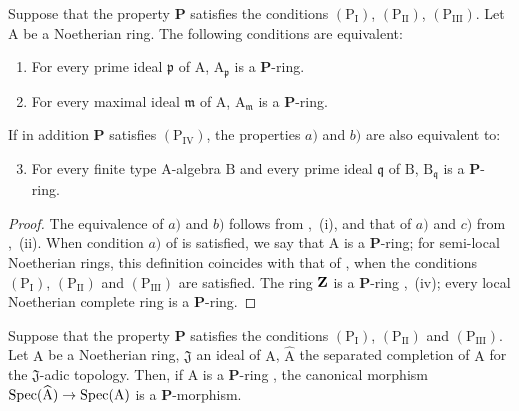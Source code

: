 \begin{corollary}[7.4.5]
\label{IV.7.4.5}
Suppose that the property $\boldsymbol{P}$ satisfies the conditions $(\mathrm{P_I})$, $(\mathrm{P_{II}})$, $(\mathrm{P_{III}})$.
Let $\mathrm{A}$ be a Noetherian ring.
The following conditions are equivalent:
\begin{enumerate}[label=\emph{\alph*)}]
  \item For every prime ideal $\mathfrak{p}$ of $\mathrm{A}$, $\mathrm{A}_\mathfrak{p}$ is a $\boldsymbol{P}$-ring.
  \item For every maximal ideal $\mathfrak{m}$ of $\mathrm{A}$, $\mathrm{A}_\mathfrak{m}$ is a $\boldsymbol{P}$-ring.
\end{enumerate}
If in addition $\boldsymbol{P}$ satisfies $(\mathrm{P_{IV}})$, the properties $a)$ and $b)$ are also equivalent to:
\begin{enumerate}[label=\emph{\alph*)}]
  \setcounter{enumi}{2}
  \item For every finite type A-algebra $\mathrm{B}$ and every prime ideal $\mathfrak{q}$ of $\mathrm{B}$, $\mathrm{B}_\mathfrak{q}$ is a $\boldsymbol{P}$-ring.
\end{enumerate}
\end{corollary}

\begin{proof}
The equivalence of $a)$ and $b)$ follows from ,~(i), and that of $a)$ and $c)$ from ,~(ii).
When condition $a)$ of  is satisfied, we say that $\mathrm{A}$ is a $\boldsymbol{P}$-ring; for semi-local Noetherian rings, this definition coincides with that of , when the conditions $(\mathrm{P_I})$, $(\mathrm{P_{II}})$ and $(\mathrm{P_{III}})$ are satisfied.
The ring $\mathbf{Z}$ is a $\boldsymbol{P}$-ring ,~(iv); every local Noetherian complete ring is a $\boldsymbol{P}$-ring.
\end{proof}

\begin{proposition}[7.4.6]
\label{IV.7.4.6}
Suppose that the property $\boldsymbol{P}$ satisfies the conditions $(\mathrm{P_I})$, $(\mathrm{P_{II}})$ and $(\mathrm{P_{III}})$.
Let $\mathrm{A}$ be a Noetherian ring, $\mathfrak{J}$ an ideal of $\mathrm{A}$, $\widehat{\mathrm{A}}$ the separated completion of $\mathrm{A}$ for the $\mathfrak{J}$-adic topology.
Then, if $\mathrm{A}$ is a $\boldsymbol{P}$-ring , the canonical morphism $\operatorname{Spec}(\widehat{\mathrm{A}})\to\operatorname{Spec}(\mathrm{A})$ is a $\boldsymbol{P}$-morphism.
\end{proposition}

